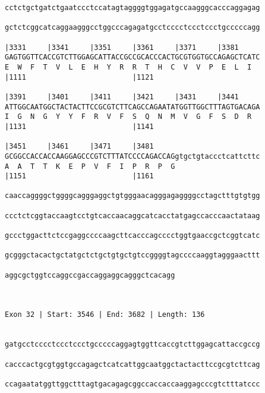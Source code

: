 \documentclass{article}
\begin{document}
\begin{Verbatim}
cctctgctgatctgaatccctccatagtaggggtggagatgccaagggcacccaggagag
                                                            
gctctcggcatcaggaagggcctggcccagagatgcctcccctccctccctgcccccagg
                                                            
|3331     |3341     |3351     |3361     |3371     |3381     
GAGTGGTTCACCGTCTTGGAGCATTACCGCCGCACCCACTGCGTGGTGCCAGAGCTCATC
E  W  F  T  V  L  E  H  Y  R  R  T  H  C  V  V  P  E  L  I  
|1111                         |1121                         
  
|3391     |3401     |3411     |3421     |3431     |3441     
ATTGGCAATGGCTACTACTTCCGCGTCTTCAGCCAGAATATGGTTGGCTTTAGTGACAGA
I  G  N  G  Y  Y  F  R  V  F  S  Q  N  M  V  G  F  S  D  R  
|1131                         |1141                         
  
|3451     |3461     |3471     |3481                         
GCGGCCACCACCAAGGAGCCCGTCTTTATCCCCAGACCAGgtgctgtaccctcattcttc
A  A  T  T  K  E  P  V  F  I  P  R  P  G                    
|1151                         |1161                         
  
caaccaggggctggggcagggaggctgtgggaacagggagaggggcctagctttgtgtgg
                                                            
ccctctcggtaccaagtcctgtcaccaacaggcatcacctatgagccacccaactataag
                                                            
gccctggacttctccgaggccccaagcttcacccagcccctggtgaaccgctcggtcatc
                                                            
gcgggctacactgctatgctctgctgtgctgtccggggtagccccaaggtagggaacttt
                                                            
aggcgctggtccaggccgaccaggaggcagggctcacagg
                                        
                                        
 
Exon 32 | Start: 3546 | End: 3682 | Length: 136


gatgcctcccctccctccctgcccccaggagtggttcaccgtcttggagcattaccgccg
                                                            
cacccactgcgtggtgccagagctcatcattggcaatggctactacttccgcgtcttcag
                                                            
ccagaatatggttggctttagtgacagagcggccaccaccaaggagcccgtctttatccc
                                                            

\end{Verbatim}
\end{document}

